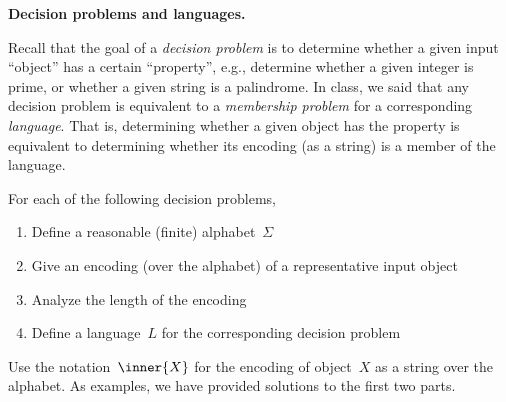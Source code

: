 \documentclass[11pt,addpoints]{exam}
\begin{document}
\begin{questions}

 \question \textbf{Decision problems and languages.}

  Recall that the goal of a \emph{decision problem} is to determine whether a given input ``object'' has a certain ``property'', e.g., determine whether a given integer is prime, or whether a given string is a palindrome.
  In class, we said that any decision problem is equivalent to a \emph{membership problem} for a corresponding \emph{language}.
  That is, determining whether a given object has the property is equivalent to determining whether its encoding (as a string) is a member of the language.

  For each of the following decision problems,
  \begin{enumerate}
      \item[(i)] Define a reasonable (finite) alphabet~$\Sigma$
      \item[(ii)] Give an encoding (over the alphabet) of a representative input object
      \item[(iii)] Analyze the length of the encoding
      \item[(iv)] Define a language~$L$ for the corresponding decision problem
  \end{enumerate}

  
  Use the notation~$\inner{X}$ for the encoding of object~$X$ as a string over the alphabet.
  As examples, we have provided solutions to the first two parts.
    
\end{questions}
\end{document}
